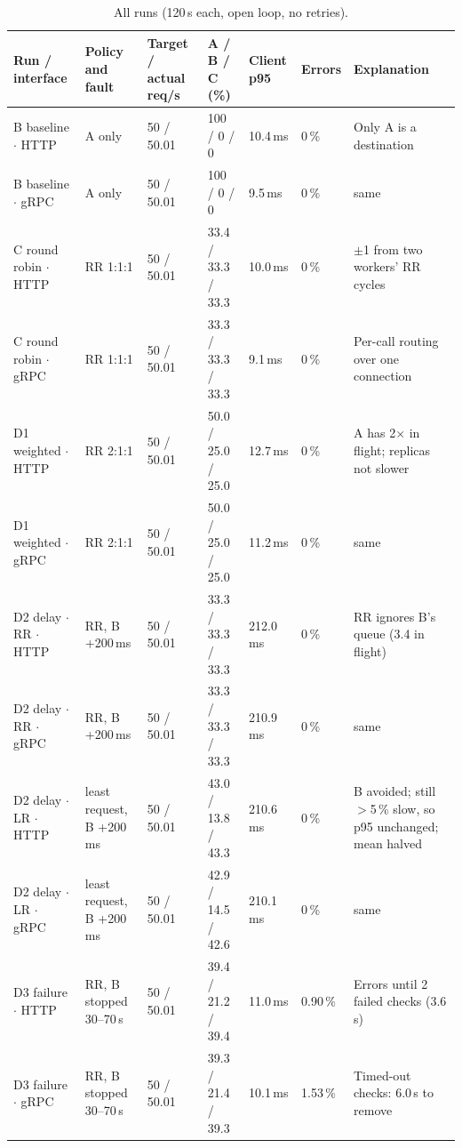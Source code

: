 \documentclass[11pt,a4paper]{article}
\begin{document}
\begin{table}[htbp]
  \centering\footnotesize
  \caption{All runs (120\,s each, open loop, no retries).}
  \label{tab:summary}
  \begin{tabularx}{\textwidth}{@{}p{2.3cm}p{2.0cm}p{1.3cm}p{2.1cm}p{1.1cm}p{0.9cm}Y@{}}
    \toprule
    Run / interface & Policy and fault & Target / actual req/s & A / B / C (\%) & Client p95 & Errors & Explanation \\
    \midrule
    B baseline $\cdot$ HTTP & A only & 50 / 50.01 & 100 / 0 / 0 & 10.4\,ms & 0\,\% & Only A is a destination \\
    B baseline $\cdot$ gRPC & A only & 50 / 50.01 & 100 / 0 / 0 & 9.5\,ms & 0\,\% & same \\
    C round robin $\cdot$ HTTP & RR 1:1:1 & 50 / 50.01 & 33.4 / 33.3 / 33.3 & 10.0\,ms & 0\,\% & $\pm$1 from two workers' RR cycles \\
    C round robin $\cdot$ gRPC & RR 1:1:1 & 50 / 50.01 & 33.3 / 33.3 / 33.3 & 9.1\,ms & 0\,\% & Per-call routing over one connection \\
    D1 weighted $\cdot$ HTTP & RR 2:1:1 & 50 / 50.01 & 50.0 / 25.0 / 25.0 & 12.7\,ms & 0\,\% & A has 2$\times$ in flight; replicas not slower \\
    D1 weighted $\cdot$ gRPC & RR 2:1:1 & 50 / 50.01 & 50.0 / 25.0 / 25.0 & 11.2\,ms & 0\,\% & same \\
    D2 delay $\cdot$ RR $\cdot$ HTTP & RR, B +200\,ms & 50 / 50.01 & 33.3 / 33.3 / 33.3 & 212.0\,ms & 0\,\% & RR ignores B's queue (3.4 in flight) \\
    D2 delay $\cdot$ RR $\cdot$ gRPC & RR, B +200\,ms & 50 / 50.01 & 33.3 / 33.3 / 33.3 & 210.9\,ms & 0\,\% & same \\
    D2 delay $\cdot$ LR $\cdot$ HTTP & least request, B +200\,ms & 50 / 50.01 & 43.0 / 13.8 / 43.3 & 210.6\,ms & 0\,\% & B avoided; still $>$5\,\% slow, so p95 unchanged; mean halved \\
    D2 delay $\cdot$ LR $\cdot$ gRPC & least request, B +200\,ms & 50 / 50.01 & 42.9 / 14.5 / 42.6 & 210.1\,ms & 0\,\% & same \\
    D3 failure $\cdot$ HTTP & RR, B stopped 30--70\,s & 50 / 50.01 & 39.4 / 21.2 / 39.4 & 11.0\,ms & 0.90\,\% & Errors until 2 failed checks (3.6\,s) \\
    D3 failure $\cdot$ gRPC & RR, B stopped 30--70\,s & 50 / 50.01 & 39.3 / 21.4 / 39.3 & 10.1\,ms & 1.53\,\% & Timed-out checks: 6.0\,s to remove \\
    \bottomrule
  \end{tabularx}
\end{table}
\end{document}
